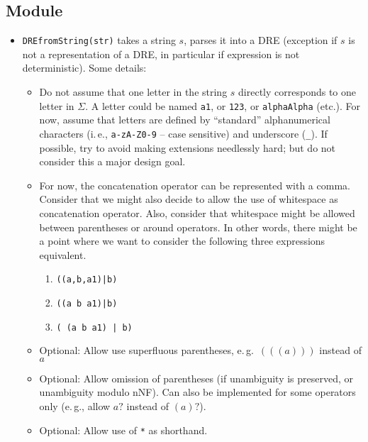 \documentclass[a4paper,11pt, svgnames,titlepage]{article}
\DeclareMathOperator{\incomp}{\#}
\begin{document}
\subsection{Module}\label{sec:des:mod}
\begin{itemize}
	\item\texttt{DREfromString(str)} takes a string $s$, parses it into a DRE (exception if $s$ is not a representation of a DRE, in particular if expression is not deterministic). Some details:
	\begin{itemize}
		\item Do not assume that one letter in the string $s$ directly corresponds to one letter in $\Sigma$. A letter could be named \texttt{a1}, or \texttt{123}, or \texttt{alphaAlpha} (etc.). For now, assume that letters are defined by ``standard'' alphanumerical characters (i.\,e., \texttt{a-zA-Z0-9} -- case sensitive) and underscore (\texttt{\_}). If possible, try to avoid making extensions needlessly hard; but do not consider this a major design goal.
		\item For now, the concatenation operator can be represented with a comma. Consider that we might also decide to allow the use of whitespace as concatenation operator. Also, consider that whitespace might be allowed between parentheses or around operators. In other words, there might be a point where we want to consider the following three expressions equivalent. \begin{enumerate}
			\item \texttt{((a,b,a1)|b)}
			\item \texttt{((a b a1)|b)}
			\item \texttt{( (a b a1) | b)}
		\end{enumerate} 
		\item Optional: Allow use superfluous parentheses, e.\,g.\ $(((a)))$ instead of $a$
		\item Optional: Allow omission of parentheses (if unambiguity is preserved, or unambiguity modulo nNF). Can also be implemented for some operators only (e.\,g., allow $a?$ instead of $(a)?$).
		\item Optional: Allow use of \texttt{*} as shorthand. 
	\end{itemize}
\end{itemize}
\end{document}
